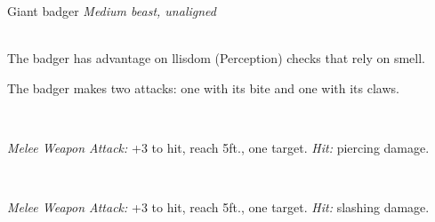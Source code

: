 \documentclass[10pt,twoside,twocolumn,openany]{book}
\begin{document}
\begin{monsterboxnobg}{Giant badger}
	\textit{Medium beast, unaligned}\\
	\hline
	\basics[
		armorclass	= 10,
		hitpoints 		= \dice{2d8 + 4},
		speed		= {30 ft., burrow 10 ft.}
	]
	\hline
	\stats[
		STR	= \stat{13},
		DEX	= \stat{10},
		CON	= \stat{15},
		INT	= \stat{2},
		WIS	= \stat{12},
		CHA	= \stat{5}
	]
	\hline
	\details[
		skills			= {},
		senses		= {darkvision 30 ft., passive Perception 11},
		languages		= {-},
		challenge		= 1/4
	]
	\hline \\[1mm]
	\begin{monsteraction}
		The badger has advantage on llisdom (Perception) checks that rely on smell.
	\end{monsteraction}
	\begin{monsteraction}[Multiattack]
		The badger makes two attacks: one with its bite and one with its claws.
	\end{monsteraction}\\
	\begin{monsteraction}[Bite]
		\textit{Melee Weapon Attack:} +3 to hit, reach 5ft., one target. \textit{Hit:}  piercing damage.
	\end{monsteraction}\\
	\begin{monsteraction}[Claws]
		\textit{Melee Weapon Attack:} +3 to hit, reach 5ft., one target. \textit{Hit:}  slashing damage.
	\end{monsteraction}
\end{monsterboxnobg}
\end{document}
